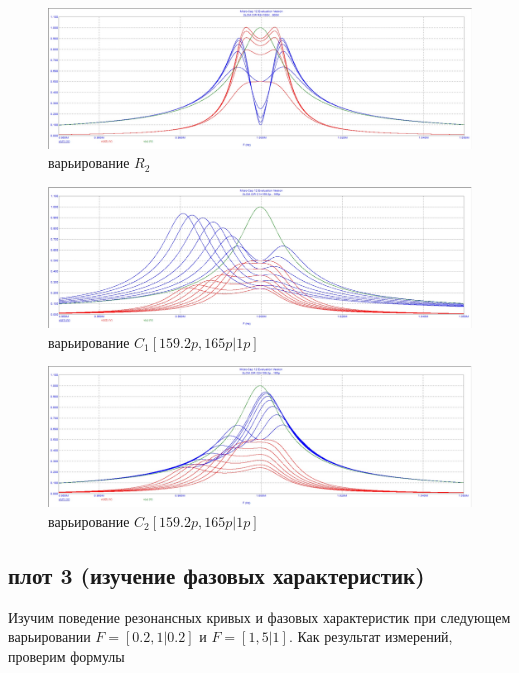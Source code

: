 \documentclass[a4paper, 14pt]{extarticle}%
\begin{document}
\begin{figure}[h!]
	\centering
			\includegraphics[width=1.1\linewidth]{1.2_varR2.jpg}
            \caption{варьирование $R_2$}
	\label{A}
\end{figure}


\begin{figure}[h!]
	\centering
			\includegraphics[width=1.1\linewidth]{1.2_varC1.jpg}
            \caption{варьирование $C_1 [159.2p, 165p|1p]$}
	\label{A}
\end{figure}


\begin{figure}[h!]
	\centering
			\includegraphics[width=1.1\linewidth]{1.2_varC2.jpg}
            \caption{варьирование $C_2 [159.2p, 165p|1p]$}
	\label{A}
\end{figure}

\newpage

\subsection{плот 3 (изучение фазовых характеристик)}

Изучим поведение резонансных кривых и фазовых характеристик при следующем варьировании $F = [0.2, 1|0.2]$ и $F = [1, 5|1]$. Как результат измерений, проверим формулы
\end{document}
